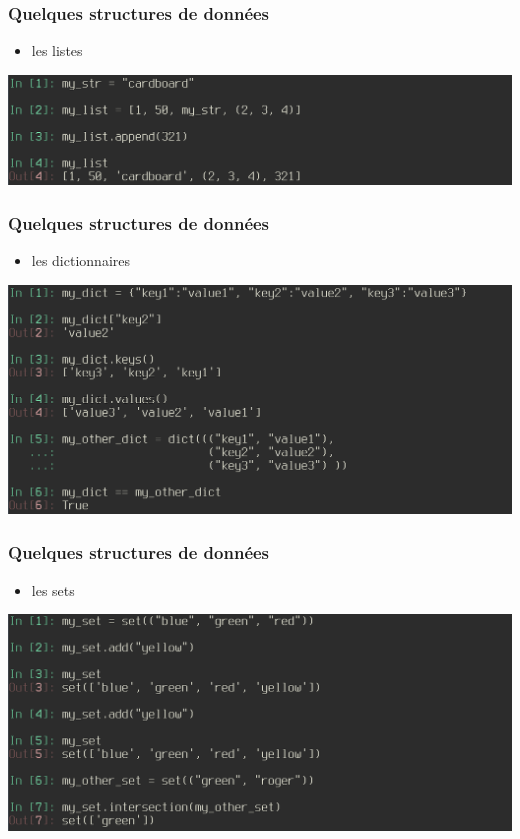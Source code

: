 \begin{frame}
  \frametitle{Quelques structures de données}
    \begin{itemize}
      \item les listes
    \end{itemize}
    \includegraphics[scale=0.35]{type_list.png}
\end{frame}

\begin{frame}
  \frametitle{Quelques structures de données}
    \begin{itemize}
      \item les dictionnaires
    \end{itemize}
    \includegraphics[scale=0.35]{type_dict.png}
\end{frame}

\begin{frame}
  \frametitle{Quelques structures de données}
    \begin{itemize}
      \item les sets
    \end{itemize}
    \includegraphics[scale=0.35]{type_set.png}
\end{frame}

